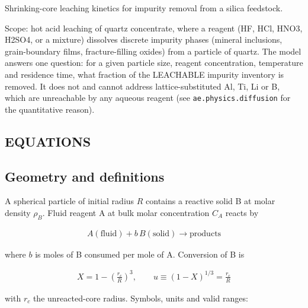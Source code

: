 \documentclass[10pt,a4paper,twoside]{report}
\begin{document}
Shrinking-core leaching kinetics for impurity removal from a silica feedstock.

Scope: hot acid leaching of quartz concentrate, where a reagent (HF, HCl, HNO3, H2SO4, or a mixture) dissolves discrete impurity phases (mineral inclusions, grain-boundary films, fracture-filling oxides) from a particle of quartz. The model answers one question: for a given particle size, reagent concentration, temperature and residence time, what fraction of the LEACHABLE impurity inventory is removed. It does not and cannot address lattice-substituted Al, Ti, Li or B, which are unreachable by any aqueous reagent (see \texttt{ae.physics.diffusion} for the quantitative reason).

\subsection*{EQUATIONS}

\subsection*{Geometry and definitions}

A spherical particle of initial radius $R$ contains a reactive solid B at molar density $\rho_B$. Fluid reagent A at bulk molar concentration $C_{A}$ reacts by

\begin{equation*}
\begin{gathered}
A(\mathrm{fluid}) + b\,B(\mathrm{solid}) \rightarrow \mathrm{products}
\end{gathered}
\end{equation*}

where $b$ is moles of B consumed per mole of A. Conversion of B is

\begin{equation*}
\begin{gathered}
X = 1 - \left(\frac{r_c}{R}\right)^3, \qquad u \equiv (1-X)^{1/3} = \frac{r_c}{R}
\end{gathered}
\end{equation*}

with $r_c$ the unreacted-core radius. Symbols, units and valid ranges:
\end{document}
